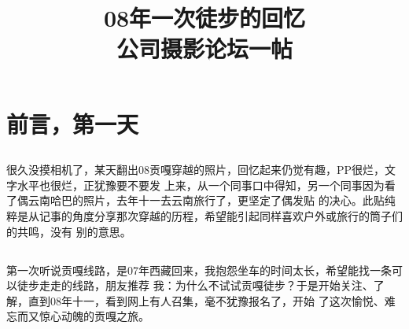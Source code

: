 ﻿\documentclass[hyperref={bookmarks=ture}xcolor=pdflatex,svgnames,table,compress]{beamer}
\title{08年一次徒步的回忆\\ \myrule 公司摄影论坛一帖}
\author{}
\date{}
\begin{document}
\begin{frame}
\titlepage
\end{frame}

\section{前言，第一天}
\subsection{}
\begin{frame}
\begin{ztebox}
  很久没摸相机了，某天翻出08贡嘎穿越的照片，回忆起来仍觉有趣，PP很烂，文字水平也很烂，正犹豫要不要发
  上来，从一个同事口中得知，另一个同事因为看了偶云南哈巴的照片，去年十一去云南旅行了，更坚定了偶发贴
  的决心。此贴纯粹是从记事的角度分享那次穿越的历程，希望能引起同样喜欢户外或旅行的筒子们的共鸣，没有
  别的意思。
\end{ztebox}
\end{frame}

\subsection{}
\begin{frame}
\begin{ztebox}
  第一次听说贡嘎线路，是07年西藏回来，我抱怨坐车的时间太长，希望能找一条可以徒步走走的线路，朋友推荐
  我：为什么不试试贡嘎徒步？于是开始关注、了解，直到08年十一，看到网上有人召集，毫不犹豫报名了，开始
  了这次愉悦、难忘而又惊心动魄的贡嘎之旅。
\end{ztebox}
\end{frame}

\subsection{}
\begin{frame}
\end{frame}


\subsection{}
\begin{frame}
\end{frame}
\end{document}
